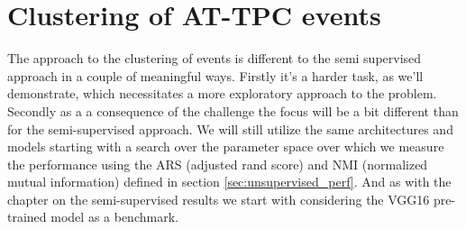 \chapter{Clustering of AT-TPC events}

The approach to the clustering of events is different to the semi supervised approach in a couple of meaningful ways. Firstly it's a harder task, as we'll demonstrate, which necessitates a more exploratory approach to the problem. Secondly as a a consequence of the challenge the focus will be a bit different than for the semi-supervised approach. We will still utilize the same architectures and models starting with a search over the parameter space over which we measure the performance using the ARS (adjusted rand score) and NMI (normalized mutual information) defined in section \ref{sec:unsupervised_perf}. And as with the chapter on the semi-supervised results we start with considering the VGG16 pre-trained model as a benchmark. 